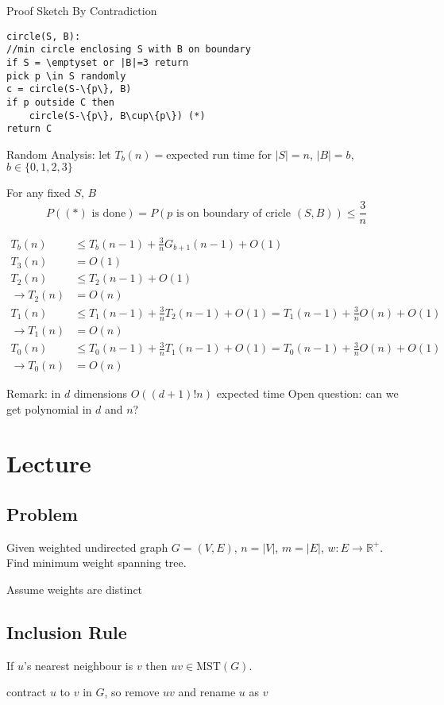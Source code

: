 \documentclass[english,12pt]{article}
\theoremstyle{plain}
\theoremstyle{definition}
\theoremstyle{definition} %
\begin{document}
Proof Sketch
By Contradiction

\begin{verbatim}
circle(S, B):
//min circle enclosing S with B on boundary
if S = \emptyset or |B|=3 return
pick p \in S randomly
c = circle(S-\{p\}, B)
if p outside C then
    circle(S-\{p\}, B\cup\{p\}) (*)
return C
\end{verbatim}

Random Analysis:
let $T_b(n)=$expected run time for $|S|=n$, $|B|=b$, $b\in\{0,1,2,3\}$

For any fixed $S$, $B$
\[P((*)\text{ is done})=P(p\text{ is on boundary of cricle } (S,B))\le\frac{3}{n}\]

\begin{align*}
T_b(n)&\le T_b(n-1)+\frac{3}{n}G_{b+1}(n-1)+O(1)\\
T_3(n) &= O(1)\\
T_2(n) &\le T_2(n-1) + O(1)\\
\rightarrow T_2(n)&=O(n)\\
T_1(n)&\le T_1(n-1) + \frac{3}{n}T_2(n-1)+O(1)
=T_1(n-1) + \frac{3}{n}O(n) + O(1)\\
\rightarrow T_1(n) &= O(n)\\
T_0(n)&\le T_0(n-1)+\frac{3}{n}T_1(n-1)+O(1)
=T_0(n-1)+\frac{3}{n}O(n)+O(1)\\
\rightarrow T_0(n)&=O(n)
\end{align*}

Remark: in $d$ dimensions $O((d+1)!n)$ expected time
Open question: can we get polynomial in $d$ and $n$?

\section{Lecture}
\subsection{Problem}
Given weighted undirected graph $G=(V,E)$, $n=|V|$, $m=|E|$, $w:E\rightarrow\mathbb{R}^+$.  Find minimum weight spanning tree.

Assume weights are distinct

\subsection{Inclusion Rule}
If $u$'s nearest neighbour is $v$ then $uv\in\text{MST}(G)$.

contract $u$ to $v$ in $G$, so remove $uv$ and rename $u$ as $v$
\end{document}
